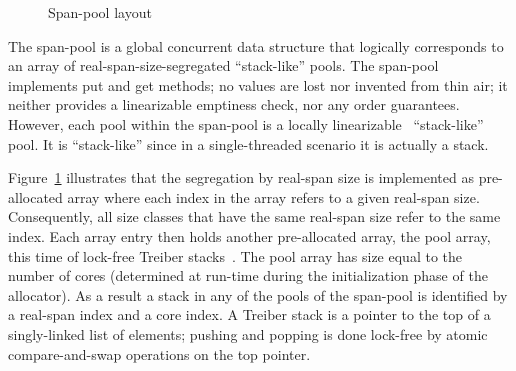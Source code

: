 \documentclass[10pt]{sigplanconf}
\begin{document}
\begin{figure}[t]
 \caption{Span-pool layout }
\label{fig:span-pool}
\end{figure}

The span-pool is a global concurrent data structure that logically corresponds
to an array of real-span-size-segregated ``stack-like'' pools. The span-pool
implements put and get methods; no values are lost nor invented from thin air;
it neither provides a linearizable emptiness check, nor any order
guarantees. However, each pool within the span-pool is a locally
linearizable~\cite{Haas:LocLin15} ``stack-like'' pool. It is ``stack-like''
since in a single-threaded scenario it is actually a stack.

Figure~\ref{fig:span-pool} illustrates that the segregation by real-span size is
implemented as pre-allocated array where each index in the array refers to a
given real-span size. Consequently, all size classes that have the same
real-span size refer to the same index. Each array entry then holds another
pre-allocated array, the pool array, this time of lock-free Treiber
stacks~\cite{Treiber86}. The pool array has size equal to the number of cores
(determined at run-time during the initialization phase of the allocator). As a
result a stack in any of the pools of the span-pool is identified by a real-span
index and a core index. A Treiber stack is a pointer to the top of a singly-linked list of elements; pushing and popping is done lock-free by atomic compare-and-swap operations on the top pointer. 
\end{document}
